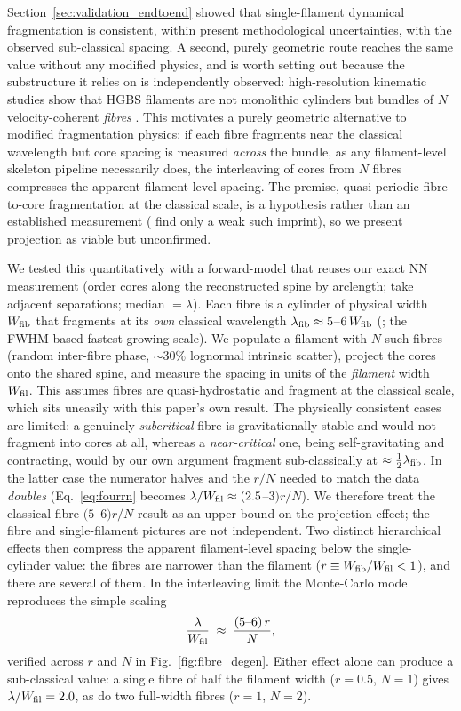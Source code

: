 \documentclass[usenatbib,twoside,twocolumn]{mnras}
\begin{document}
Section~\ref{sec:validation_endtoend} showed that single-filament dynamical fragmentation is consistent, within present methodological uncertainties, with the observed sub-classical spacing. A second, purely geometric route reaches the same value without any modified physics, and is worth setting out because the substructure it relies on is independently observed: high-resolution kinematic studies show that HGBS filaments are not monolithic cylinders but bundles of $N$ velocity-coherent \emph{fibres} \citep{Hacar2013,Hacar2018,Yang2024}. This motivates a purely geometric alternative to modified fragmentation physics: if each fibre fragments near the classical wavelength but core spacing is measured \emph{across} the bundle, as any filament-level skeleton pipeline necessarily does, the interleaving of cores from $N$ fibres compresses the apparent filament-level spacing. The premise, quasi-periodic fibre-to-core fragmentation at the classical scale, is a hypothesis rather than an established measurement (\citealt{Yang2024} find only a weak such imprint), so we present projection as viable but unconfirmed.

We tested this quantitatively with a forward-model that reuses our exact NN measurement (order cores along the reconstructed spine by arclength; take adjacent separations; median $=\lambda$). Each fibre is a cylinder of physical width $W_{\rm fib}$ that fragments at its \emph{own} classical wavelength $\lambda_{\rm fib}\approx5$--$6\,W_{\rm fib}$ (\citealt{Fischera2012}; the FWHM-based fastest-growing scale). We populate a filament with $N$ such fibres (random inter-fibre phase, $\sim30\%$ lognormal intrinsic scatter), project the cores onto the shared spine, and measure the spacing in units of the \emph{filament} width $W_{\rm fil}$. This assumes fibres are quasi-hydrostatic and fragment at the classical scale, which sits uneasily with this paper's own result. The physically consistent cases are limited: a genuinely \emph{subcritical} fibre is gravitationally stable and would not fragment into cores at all, whereas a \emph{near-critical} one, being self-gravitating and contracting, would by our own argument fragment sub-classically at $\approx\tfrac12\lambda_{\rm fib}$. In the latter case the numerator halves and the $r/N$ needed to match the data \emph{doubles} (Eq.~\ref{eq:fourrn} becomes $\lambda/W_{\rm fil}\approx(2.5$--$3)r/N$). We therefore treat the classical-fibre $(5$--$6)r/N$ result as an upper bound on the projection effect; the fibre and single-filament pictures are not independent. Two distinct hierarchical effects then compress the apparent filament-level spacing below the single-cylinder value: the fibres are narrower than the filament ($r\equiv W_{\rm fib}/W_{\rm fil}<1$), and there are several of them. In the interleaving limit the Monte-Carlo model reproduces the simple scaling
\begin{equation}
\frac{\lambda}{W_{\rm fil}} \;\approx\; \frac{(5\text{--}6)\,r}{N},
\label{eq:fourrn}
\end{equation}
verified across $r$ and $N$ in Fig.~\ref{fig:fibre_degen}. Either effect alone can produce a sub-classical value: a single fibre of half the filament width ($r=0.5$, $N=1$) gives $\lambda/W_{\rm fil}=2.0$, as do two full-width fibres ($r=1$, $N=2$).
\end{document}
